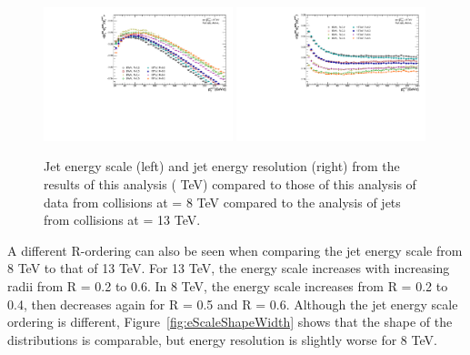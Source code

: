 \begin{figure}[hbt!]
    \centering
    \includegraphics[width=0.49\textwidth]{figures/EnergyScale/EnergyScaleMean_Comparison.pdf}
    \includegraphics[width=0.49\textwidth]{figures/EnergyScale/EnergyScaleWidth_Comparison.pdf}
    \caption{Jet energy scale (left) and jet energy resolution (right) from the results of this analysis ( TeV) compared to those of this analysis of data from \pp collisions at \s = 8 TeV compared to the analysis of jets from \pp collisions at \s = 13 TeV.}
    \label{fig:EnergyScaleComp}
\end{figure}

A different R-ordering can also be seen when comparing the jet energy scale from 8 TeV to that of 13 TeV. For 13 TeV, the energy scale increases with increasing radii from R = 0.2 to 0.6. In 8 TeV, the energy scale increases from R = 0.2 to 0.4, then decreases again for R = 0.5 and R = 0.6. Although the jet energy scale ordering is different, Figure~\ref{fig:eScaleShapeWidth} shows that the shape of the distributions is comparable, but energy resolution is slightly worse for 8 TeV.


